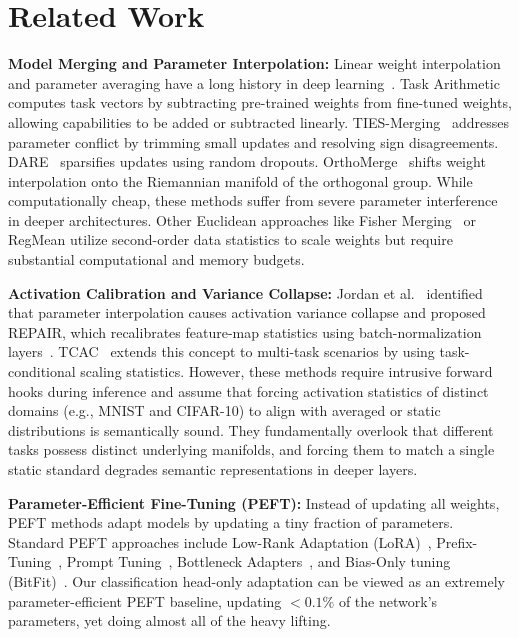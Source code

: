 \documentclass{article}
\theoremstyle{plain}
\theoremstyle{definition}
\theoremstyle{remark}
\begin{document}
\section{Related Work}
\label{sec:related}

\textbf{Model Merging and Parameter Interpolation:} Linear weight interpolation and parameter averaging have a long history in deep learning~\cite{langley00, wortsman2022robust, sucholutsky2023less}. Task Arithmetic~\cite{ilharco2022editing} computes task vectors by subtracting pre-trained weights from fine-tuned weights, allowing capabilities to be added or subtracted linearly. TIES-Merging~\cite{yadav2023ties} addresses parameter conflict by trimming small updates and resolving sign disagreements. DARE~\cite{yu2024language} sparsifies updates using random dropouts. OrthoMerge~\cite{yang2026orthogonal} shifts weight interpolation onto the Riemannian manifold of the orthogonal group. While computationally cheap, these methods suffer from severe parameter interference in deeper architectures. Other Euclidean approaches like Fisher Merging~\cite{yadav2023ties} or RegMean utilize second-order data statistics to scale weights but require substantial computational and memory budgets.

\textbf{Activation Calibration and Variance Collapse:} Jordan et al.~\cite{jordan2022repair} identified that parameter interpolation causes activation variance collapse and proposed REPAIR, which recalibrates feature-map statistics using batch-normalization layers~\cite{ioffe2015batch}. TCAC~\cite{tcac2026} extends this concept to multi-task scenarios by using task-conditional scaling statistics. However, these methods require intrusive forward hooks during inference and assume that forcing activation statistics of distinct domains (e.g., MNIST and CIFAR-10) to align with averaged or static distributions is semantically sound. They fundamentally overlook that different tasks possess distinct underlying manifolds, and forcing them to match a single static standard degrades semantic representations in deeper layers.

\textbf{Parameter-Efficient Fine-Tuning (PEFT):} Instead of updating all weights, PEFT methods adapt models by updating a tiny fraction of parameters. Standard PEFT approaches include Low-Rank Adaptation (LoRA)~\cite{hu2021lora}, Prefix-Tuning~\cite{li2021prefix}, Prompt Tuning~\cite{lester2021power}, Bottleneck Adapters~\cite{houlsby2019parameter}, and Bias-Only tuning (BitFit)~\cite{benzaken2022bitfit}. Our classification head-only adaptation can be viewed as an extremely parameter-efficient PEFT baseline, updating $<0.1\%$ of the network's parameters, yet doing almost all of the heavy lifting.
\end{document}
